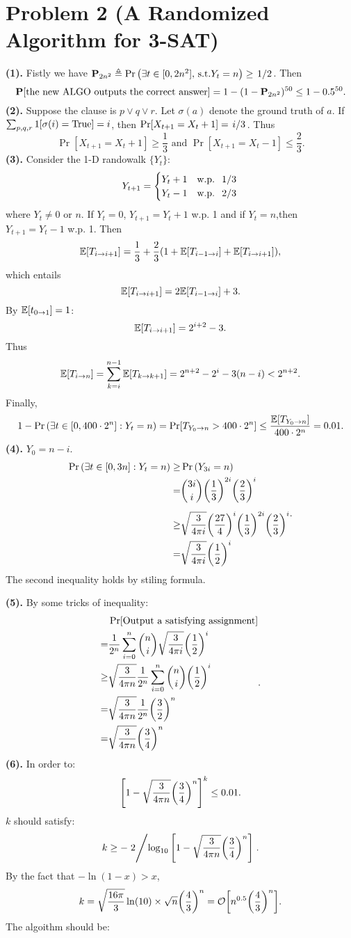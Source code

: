 \documentclass{article}
\begin{document}
\section*{Problem 2 (A Randomized Algorithm for 3-SAT)}
\textbf{(1).}
Fistly we have $\P_{2n^2}\defeq\Pr\qty(\exists t\in[0,2n^2],\,\-{s.t.}Y_t=n)\ge \flatfrac{1}{2}$. Then
\[
	\P[\text{the new ALGO outputs the correct answer}]
	=
	1-(1-\P_{2n^2})^{50}\le 1-0.5^{50}
	.\]
\textbf{(2).}
Suppose the clause is $p\lor q\lor r$. Let $\sigma(a)$ denote the ground truth of $a$. If $\sum_{p,q,r}1[\sigma(i)=\-{True}]=i$, then $\Pr[X_{t+1}=X_t+1]=\flatfrac{i}{3}$.
Thus
\[
	\Pr[X_{t+1}=X_t+1]\ge \frac{1}{3}\text{ and }\Pr[X_{t+1}=X_t-1]\le\frac{2}{3}
	.\]
\textbf{(3).}
Consider the 1-D randowalk $\{Y_t\}$:
\[
	Y_{t+1}=
	\begin{cases}
		Y_t+1 & \text{w.p. }\flatfrac{1}{3} \\
		Y_t-1 & \text{w.p. }\flatfrac{2}{3} \\
	\end{cases}
\] where $Y_t\ne 0$ or $n$.
If $Y_t=0$, $Y_{t+1}=Y_t+1$ w.p. 1 and if $Y_t=n$,then $Y_{t+1}=Y_t-1$ w.p. 1. Then
\[
	\=E[T_{i\to i+1}]=\frac{1}{3}+\frac{2}{3}(1+\=E[T_{i-1\to i}]+\=E[T_{i\to i+1}])
	,\] which entails
\[
	\=E[T_{i\to i+1}]=2\=E[T_{i-1\to i}]+3
	.\] By $\=E[t_{0\to 1}]=1$:
\[
	\=E[T_{i\to i+1}]=2^{i+2}-3
	.\] Thus
\[
	\=E[T_{i\to n}]=\sum_{k=i}^{n-1}\=E[T_{k\to k+1}]=2^{n+2}-2^i-3(n-i)<2^{n+2}
	.\]
Finally,
\[
	1-\Pr\qty(\exists t\in[0,400\cdot2^n]:Y_t=n)
	=
	\Pr[T_{Y_0\to n}>400\cdot2^n]
	\le
	\frac{\=E[T_{Y_0\to n}]}{400\cdot2^n}
	=
	0.01
	.\]
\textbf{(4).} $Y_0=n-i$.
\[
	\begin{aligned}
		\Pr\qty(\exists t\in[0,3n]:Y_t=n)
		\ge&
		\Pr\qty(Y_{3i}=n)
		\\=&
		\binom{3i}{i}\qty(\frac{1}{3})^{2i}\qty(\frac{2}{3})^i
		\\[5pt]\ge &
		\sqrt{\frac{3}{4\pi i}}\qty(\frac{27}{4})^i\qty(\frac{1}{3})^{2i}\qty(\frac{2}{3})^i
		\\=&
		\sqrt{\frac{3}{4\pi i}}\qty(\frac{1}{2})^i
	\end{aligned}
.\]
The second inequality holds by stiling formula.

\newpage
\textbf{(5).} By some tricks of inequality:
\[
	\begin{aligned}
		&\Pr[\text{Output a satisfying assignment}]
		\\=&
		\frac{1}{2^n}\sum_{i=0}^n \binom{n}{i}\sqrt{\frac{3}{4\pi i}}\qty(\frac{1}{2})^i
		\\\ge &
		\sqrt{\frac{3}{4\pi n}}\frac{1}{2^n}\sum_{i=0}^n \binom{n}{i}\qty(\frac{1}{2})^i
		\\=&
		\sqrt{\frac{3}{4\pi n}}\frac{1}{2^n}\qty(\frac{3}{2})^n		
		\\=&
		\sqrt{\frac{3}{4\pi n}}\qty(\frac{3}{4})^n		
	\end{aligned}
.\] 
\textbf{(6).}
In order to:
\[
	\qty[1-\sqrt{\frac{3}{4\pi n}}\qty(\frac{3}{4})^n]^k
	\le 0.01
.\] 
$k$ should satisfy:
\[
	k\ge -\flatfrac{2}{\log_{10}\qty[1-\sqrt{\frac{3}{4\pi n}}\qty(\frac{3}{4})^n]}
.\] By the fact that $-\ln(1-x)>x$,
\[
	k=\sqrt{\frac{16\pi}{3}}\ln(10)\times
	\sqrt{n}\qty(\frac{4}{3})^n
	=
	\+O\qty[n^{0.5}\qty(\frac{4}{3})^n]
.\] 
The algoithm should be:
\end{document}
